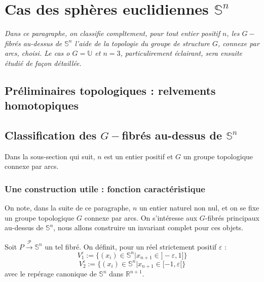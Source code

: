 \chapter{Cas des sph\`eres euclidiennes $\mathbb{S}^n$}

\emph{%
Dans ce paragraphe, on classifie compltement, pour tout entier positif $n$, les $G-$fibr\'es au-dessus de $\mathbb{S}^n$ %
 l'aide de la topologie du groupe de structure $G$, connexe par arcs, choisi. %
Le cas o $G=\mathbb{U}$ et $n=3$, particulirement \'eclairant, sera ensuite \'etudi\'e de fa\c con d\'etaill\'ee.%
}


\section{Pr\'eliminaires topologiques : relvements homotopiques}


\section{Classification des $G-$fibr\'es au-dessus de $\mathbb{S}^n$}

Dans la sous-section qui suit, $n$ est un entier positif et $G$ un groupe topologique connexe par arcs.

\subsection{Une construction utile : fonction caract\'eristique}
%

On note, dans la suite de ce paragraphe, $n$ un entier naturel non nul, et on se fixe un groupe topologique $G$ connexe par arcs. %
On s'intéresse aux $G$-fibrés principaux au-dessus de $\mathbb{S}^n$, nous allons construire un invariant complet pour ces objets.

\par
Soit $P \xrightarrow{\mathcal{P}} \mathbb{S}^n$ un tel fibré. On définit, pour un réel strictement positif $\varepsilon$ :
\[
V_1^{\varepsilon} := \{(x_i) \in \mathbb{S}^n | x_{n+1} \in ]-\varepsilon , 1]\}%
\]
%
\[
V_2^{\varepsilon} := \{(x_i) \in \mathbb{S}^n | x_{n+1} \in [-1,\varepsilon [ \}%
\]
avec le repérage canonique de $\mathbb{S}^n$ dans $\mathbb{R}^{n+1}$.

